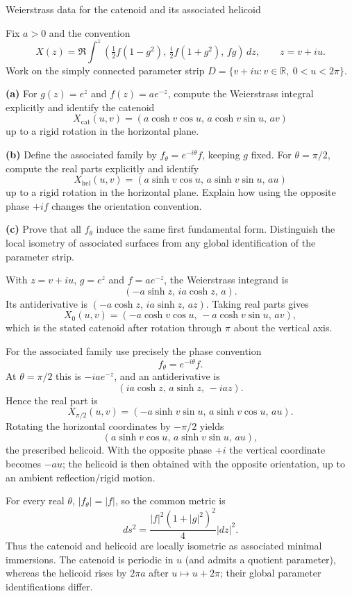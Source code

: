 \begin{problem}[CP-IV-0060]
\label{prob:cp-iv-0060}
Weierstrass data for the catenoid and its associated helicoid

Fix $a>0$ and the convention
\[
X(z)=\Re\int^z\left(\tfrac12 f(1-g^2),\,
\tfrac{i}{2}f(1+g^2),\,fg\right)\,dz,
\qquad z=v+iu.
\]
Work on the simply connected parameter strip
$D=\{v+iu:v\in\mathbb R,\ 0<u<2\pi\}$.

\par\noindent\textbf{(a)} For $g(z)=e^z$ and $f(z)=ae^{-z}$,
compute the Weierstrass integral explicitly and identify the catenoid
\[
X_{\mathrm{cat}}(u,v)=
(a\cosh v\cos u,\,a\cosh v\sin u,\,av)
\]
up to a rigid rotation in the horizontal plane.

\par\noindent\textbf{(b)} Define the associated family by
$f_\theta=e^{-i\theta}f$, keeping $g$ fixed.
For $\theta=\pi/2$, compute the real parts explicitly and identify
\[
X_{\mathrm{hel}}(u,v)=
(a\sinh v\cos u,\,a\sinh v\sin u,\,au)
\]
up to a rigid rotation in the horizontal plane. Explain how using the
opposite phase $+if$ changes the orientation convention.

\par\noindent\textbf{(c)} Prove that all $f_\theta$ induce the same
first fundamental form. Distinguish the local isometry of associated
surfaces from any global identification of the parameter strip.
\end{problem}



\begin{solution}
With $z=v+iu$, $g=e^z$ and $f=ae^{-z}$, the Weierstrass integrand is
\[
(-a\sinh z,\,ia\cosh z,\,a).
\]
Its antiderivative is $(-a\cosh z,\,ia\sinh z,\,az)$.
Taking real parts gives
\[
X_0(u,v)=(-a\cosh v\cos u,\,-a\cosh v\sin u,\,av),
\]
which is the stated catenoid after rotation through $\pi$ about the
vertical axis.

For the associated family use precisely the phase convention
\[
f_\theta=e^{-i\theta}f.
\]
At $\theta=\pi/2$ this is $-iae^{-z}$, and an antiderivative is
\[
(ia\cosh z,\,a\sinh z,\,-iaz).
\]
Hence the real part is
\[
X_{\pi/2}(u,v)=
(-a\sinh v\sin u,\,a\sinh v\cos u,\,au).
\]
Rotating the horizontal coordinates by $-\pi/2$ yields
\[
\boxed{(a\sinh v\cos u,\,a\sinh v\sin u,\,au)},
\]
the prescribed helicoid. With the opposite phase $+i$ the vertical
coordinate becomes $-au$; the helicoid is then obtained with the
opposite orientation, up to an ambient reflection/rigid motion.

For every real $\theta$, $|f_\theta|=|f|$, so the common metric is
\[
ds^2=\frac{|f|^2(1+|g|^2)^2}{4}|dz|^2.
\]
Thus the catenoid and helicoid are locally isometric as associated
minimal immersions. The catenoid is periodic in $u$ (and admits a
quotient parameter), whereas the helicoid rises by $2\pi a$ after
$u\mapsto u+2\pi$; their global parameter identifications differ.
\end{solution}

